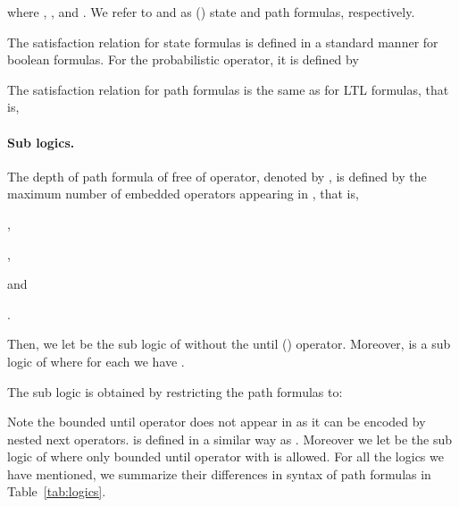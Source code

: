 \documentclass{LMCS}
\begin{document}
where , , and . We refer to  and  as () state and
path formulas, respectively.

The satisfaction relation  for state formulas is
 defined in a standard manner for boolean formulas. For the probabilistic operator, it is defined by

The satisfaction relation  for path
formulas is the same as for LTL formulas, that is,





\paragraph{Sub logics.}
The depth of path formula  of  free of  operator, denoted by , is defined by the maximum number of embedded  operators appearing in , that is,
\begin{iteMize}{}
\item ,
\item ,
\item  and
\item .
\end{iteMize}
Then, we let
 be the sub logic of  without the until () operator. Moreover,  is a sub logic of  where
 for each  we have .



The sub logic  is obtained by restricting the path formulas to:

Note the bounded until operator does not appear in  as it
can be encoded by nested next operators.   is defined in a
similar way as .  Moreover we let  be the
sub logic of  where only bounded until operator
 with  is allowed. For all the logics
we have mentioned, we summarize their
differences in syntax of path formulas in
Table~\ref{tab:logics}.
\end{document}
